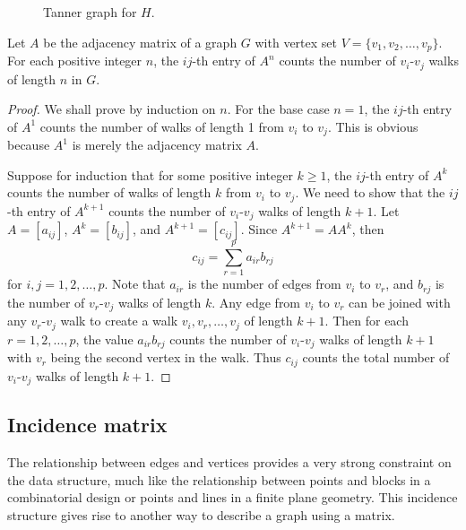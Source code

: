 \begin{figure}[!htbp]
\centering

\caption{Tanner graph for $H$.}
\label{fig:introduction:tanner_graph}
\end{figure}

\begin{theorem}
Let $A$ be the adjacency matrix of a graph $G$ with vertex set
$V = \{v_1, v_2, \dots, v_p\}$. For each positive integer $n$, the
$ij$-th entry of $A^n$ counts the number of $v_i$-$v_j$ walks of
length $n$ in $G$.
\end{theorem}

\begin{proof}
We shall prove by induction on $n$. For the base case $n = 1$, the
$ij$-th entry of $A^1$ counts the number of walks of length 1 from
$v_i$ to $v_j$. This is obvious because $A^1$ is merely the adjacency
matrix $A$.

Suppose for induction that for some positive integer $k \geq 1$, the
$ij$-th entry of $A^k$ counts the number of walks of length $k$ from
$v_i$ to $v_j$. We need to show that the $ij$-th entry of $A^{k+1}$
counts the number of $v_i$-$v_j$ walks of length $k + 1$. Let
$A = [a_{ij}]$, $A^k = [b_{ij}]$, and $A^{k+1} = [c_{ij}]$. Since
$A^{k+1} = A A^k$, then
\[
c_{ij}
=
\sum_{r=1}^p a_{ir} b_{rj}
\]
for $i,j = 1, 2, \dots, p$. Note that $a_{ir}$ is the number of edges
from $v_i$ to $v_r$, and $b_{rj}$ is the number of $v_r$-$v_j$ walks
of length $k$. Any edge from $v_i$ to $v_r$ can be joined with any
$v_r$-$v_j$ walk to create a walk $v_i, v_r, \dots, v_j$ of length
$k + 1$. Then for each $r = 1, 2, \dots, p$, the value $a_{ir} b_{rj}$
counts the number of $v_i$-$v_j$ walks of length $k + 1$ with $v_r$
being the second vertex in the walk. Thus $c_{ij}$ counts the total
number of $v_i$-$v_j$ walks of length $k + 1$.
\end{proof}



\subsection{Incidence matrix}

The relationship between edges and vertices provides a very strong
constraint on the data structure, much like the relationship between
points and blocks in a combinatorial design or points and lines in a
finite plane geometry. This incidence structure gives rise to another
way to describe a graph using a matrix.

